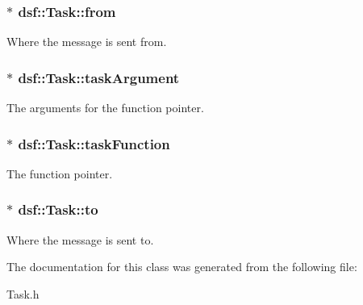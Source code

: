 \subsubsection[{from}]{$\ast$ dsf\+::\+Task\+::from}\label{classdsf_1_1_task_afc1faf30dab0d57501dfdcb4ef7b5450}
Where the message is sent from. \hypertarget{classdsf_1_1_task_a8a095d8a36668f6500d4df8c24dbef8d}{}
\subsubsection[{task\+Argument}]{$\ast$ dsf\+::\+Task\+::task\+Argument}\label{classdsf_1_1_task_a8a095d8a36668f6500d4df8c24dbef8d}
The arguments for the function pointer. \hypertarget{classdsf_1_1_task_a681617cab34fbae641c5b0cf4be46659}{}
\subsubsection[{task\+Function}]{$\ast$ dsf\+::\+Task\+::task\+Function}\label{classdsf_1_1_task_a681617cab34fbae641c5b0cf4be46659}
The function pointer. \hypertarget{classdsf_1_1_task_a36c485fbeb9c2330f5637b9d625cf01a}{}
\subsubsection[{to}]{$\ast$ dsf\+::\+Task\+::to}\label{classdsf_1_1_task_a36c485fbeb9c2330f5637b9d625cf01a}
Where the message is sent to. 

The documentation for this class was generated from the following file\+:\begin{DoxyCompactItemize}
\item 
Task.\+h\end{DoxyCompactItemize}
